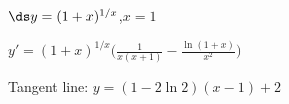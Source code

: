 {$\ds y=(1+x)^{1/x}$,\quad $x=1$
}
{$y'= (1+x)^{1/x}\big(\frac{1}{x(x+1)}-\frac{\ln(1+x)}{x^2}\big)$

Tangent line: $y = (1-2\ln 2)(x-1)+ 2$
}
